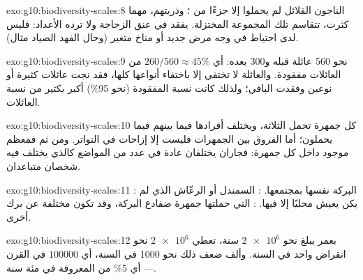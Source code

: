 \begin{solution}{exo:g10:biodiversity-scales:8}
الناجون القلائل لم يحملوا إلا جزءًا من  ؛ وذريتهم، مهما
كثرت، تتقاسم تلك المجموعة المختزلة.  يفقد في عنق
الزجاجة ولا ترده الأعداد: فليس لدى  احتياط في وجه مرض جديد أو
مناخ متغير (وحال الفهد الصياد مثال).
\end{solution}

\begin{solution}{exo:g10:biodiversity-scales:9}
نحو 560 عائلة قبله و300 بعده: أي $260/560 \approx 45\%$ من العائلات
مفقودة. والعائلة لا تختفي إلا باختفاء أنواعها كلها، فقد نجت عائلات
كثيرة  أو نوعين وفقدت الباقي؛ ولذلك كانت نسبة  المفقودة
(نحو 95\%) أكبر بكثير من نسبة العائلات.
\end{solution}

\begin{solution}{exo:g10:biodiversity-scales:10}
كل جمهرة تحمل  الثلاثة، ويختلف أفرادها فيما بينهم فيما يحملون؛
أما الفروق بين الجمهرات فليست إلا إزاحات في التواتر. ومن ثم فمعظم
  موجود داخل كل جمهرة: فجاران يختلفان عادة في عدد
من المواضع كالذي يختلف فيه شخصان متباعدان.
\end{solution}

\begin{solution}{exo:g10:biodiversity-scales:11}
: البركة نفسها بمجتمعها. : السمندل أو الرعّاش الذي
لم يكن يعيش محليًا إلا فيها. :  التي حملتها جمهرة
ضفادع البركة، وقد تكون مختلفة عن  برك أخرى.
\end{solution}

\begin{solution}{exo:g10:biodiversity-scales:12}
بعمر يبلغ نحو $\num{2e6}$ سنة، تعطي $\num{2e6}$  نحو انقراض واحد
في السنة. وألف ضعف ذلك نحو 1000  في السنة، أي $\num{100000}$ في
القرن --- أي 5\% من  المعروفة في مئة سنة.
\end{solution}

